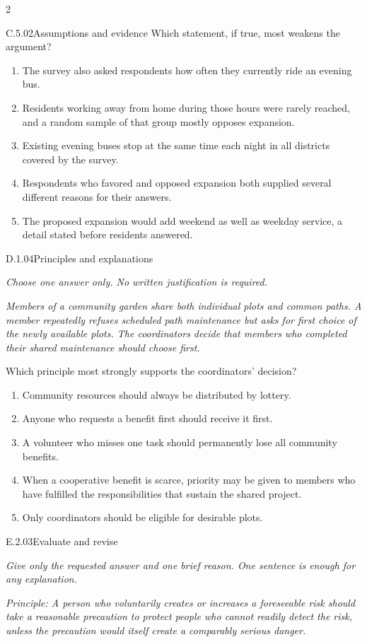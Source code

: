 \documentclass[9pt]{extarticle}
\newcommand{\choice}[1]{\item #1}
\begin{document}
\begin{multicols}{2}
\begin{DenseCoreProblem}{C.5.02}{Assumptions and evidence}
Which statement, if true, most weakens the argument?
\begin{enumerate}[label=(\alph*)]
  \choice{The survey also asked respondents how often they currently ride an evening bus.}
  \choice{Residents working away from home during those hours were rarely reached, and a random sample of that group mostly opposes expansion.}
  \choice{Existing evening buses stop at the same time each night in all districts covered by the survey.}
  \choice{Respondents who favored and opposed expansion both supplied several different reasons for their answers.}
  \choice{The proposed expansion would add weekend as well as weekday service, a detail stated before residents answered.}
\end{enumerate}
\end{DenseCoreProblem}
\begin{DenseCoreProblem}{D.1.04}{Principles and explanations}
{\scriptsize\textit{Choose one answer only. No written justification is required.}\par}
\emph{Members of a community garden share both individual plots and common paths. A member repeatedly refuses scheduled path maintenance but asks for first choice of the newly available plots. The coordinators decide that members who completed their shared maintenance should choose first.}

Which principle most strongly supports the coordinators' decision?
\begin{enumerate}[label=(\alph*)]
  \choice{Community resources should always be distributed by lottery.}
  \choice{Anyone who requests a benefit first should receive it first.}
  \choice{A volunteer who misses one task should permanently lose all community benefits.}
  \choice{When a cooperative benefit is scarce, priority may be given to members who have fulfilled the responsibilities that sustain the shared project.}
  \choice{Only coordinators should be eligible for desirable plots.}
\end{enumerate}
\end{DenseCoreProblem}
\begin{DenseCoreProblem}{E.2.03}{Evaluate and revise}
{\scriptsize\textit{Give only the requested answer and one brief reason. One sentence is enough for any explanation.}\par}
\emph{Principle: A person who voluntarily creates or increases a foreseeable risk should take a reasonable precaution to protect people who cannot readily detect the risk, unless the precaution would itself create a comparably serious danger.}


\end{DenseCoreProblem}
\end{multicols}
\end{document}
